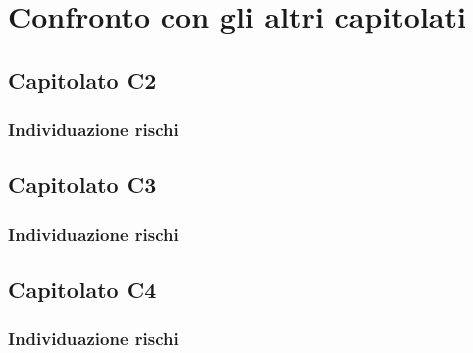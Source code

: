 \section{Confronto con gli altri capitolati}
\subsection{Capitolato C2}
\subsubsection{Individuazione rischi}
\subsection{Capitolato C3}
\subsubsection{Individuazione rischi}
\subsection{Capitolato C4}
\subsubsection{Individuazione rischi}

